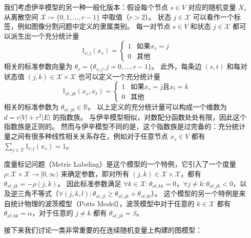 \begin{tcolorbox}
\begin{exam}[度量标记和波茨模型]

我们考虑伊辛模型的另一种一般化版本：假设每个节点 $s \in V$ 对应的随机变量 $X_s$ 从离散空间 $\mathcal{X} \coloneqq \{0, 1, \dots, r-1\}$ 中取值（$r > 2$）。
状态 $j \in  \mathcal{X}$ 可以看作一个标签，例如图像分割问题中定义的隶属类别。
每一对节点 $s \in V$ 和状态 $j \in \mathcal{X}$ 都可以派生出一个充分统计量
\begin{equation}
    \mathbb{I}_{s;j}(x_s) = \begin{cases}
        1 & \text{如果} x_s = j \\
        0 & \text{其他}
    \end{cases}
\end{equation}
相关的标准参数向量为 $\theta_s = \{\theta_{s;j}, j = 0, \dots, r-1\}$。
此外，每条边 $(s, t)$ 和每对状态值 $(j, k) \in \mathcal{X} \times \mathcal{X}$ 也可以定义一个充分统计量
\begin{equation}
    \mathbb{I}_{st;jk}(x_s, x_t) = \begin{cases}
        1 & \text{如果} x_s = j \text{且} x_t = k \\
        0 & \text{其他}
    \end{cases}
\end{equation}
相关的标准参数为 $\theta_{st;jk} \in \mathbb{R}$。
以上定义的充分统计量可以构成一个维数为 $d = r|V| + r^2|E|$ 的指数族。
与伊辛模型相似，对数配分函数处处有限，因此这个指数族是正则的。
然而与伊辛模型不同的是，这个指数族是过完备的：充分统计量之间有很多种线性相关关系存在，例如对于任意节点 $x_s \in V$ 都有 $\sum_{j \in \mathcal{X}}\mathbb{I}_{s;j}(x_s) = 1$。

度量标记问题（Metric Labeling）是这个模型的一个特例，它引入了一个度量 $\rho: \mathcal{X} \times \mathcal{X} \rightarrow [0, \infty)$ 来确定参数，即对所有 $(j, k) \in \mathcal{X} \times \mathcal{X}$，都有 $\theta_{st;jk} = -\rho(j, k)$。
因此标准参数满足 $\forall k \in \mathcal{X}: \theta_{st;kk} = 0$，$\forall j \neq k: \theta_{st;jk} < 0$，以及逆三角不等式（$\forall (j, k, l): \theta_{st;jl} \geq \theta_{st;jk} + \theta_{st;kl}$）。
这个模型的另一个特例是来自统计物理的波茨模型（Potts Model），波茨模型中对于任意的 $k \in \mathcal{X}$ 都有 $\theta_{st;kk} = \alpha$，对于任意的 $j \neq k$ 都有 $\theta_{st;jk} = \beta$。

\end{exam}
\end{tcolorbox}

接下来我们讨论一类非常重要的在连续随机变量上构建的图模型：

